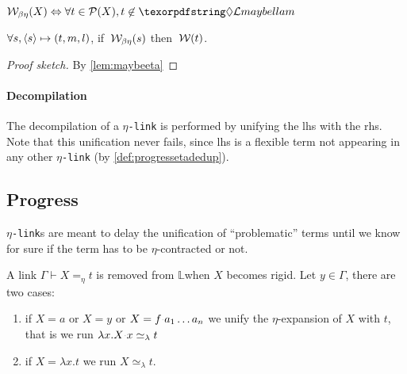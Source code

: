 \documentclass[sigconf,natbib=false,review]{acmart}
\newcommand{\appsep}{\ensuremath{\textcolor{lightgray}{\cdot}}}
\newcommand{\UnifRel}{\ensuremath{\simeq}}
\newcommand{\Ue}{\ensuremath{\UnifRel_\lambda}\xspace}
\newcommand{\linkMacro}[1]{\ensuremath{#1}\texttt{-link}\xspace}
\newcommand{\linketa} {\linkMacro{\eta}}
\newcommand{\linketaM}[3]{\ensuremath{#1 \vdash #2 =_\eta #3}}
\newcommand{\lhs}{lhs\xspace}
\newcommand{\rhs}{rhs\xspace}
\newcommand{\linkStore}{\texorpdfstring{\ensuremath{\mathbb{L}}\xspace}{L}}
\begin{document}
\begin{definition}[$\wellb_{\beta \eta}$]
  $
  \wellb_{\beta \eta}(X) \Leftrightarrow \forall t \in \subterm{X}, t \not\in \notllambda{}
  $
\end{definition}

\begin{lemma}\label{lem:w-enforcement-maybeeta}
  $\forall s, \langle s \rangle\mapsto(t,m,l)$, if $\:\mathcal{W}_{\beta \eta}(s)$  then $\:\mathcal{W}(t)$.
\end{lemma}

\begin{proof}[Proof sketch]
  By \cref{lem:maybeeta}
\end{proof}


\paragraph{Decompilation}
The decompilation of a \linketa is performed by unifying
the \lhs with the \rhs. Note that this unification never fails, since \lhs is a
flexible term not appearing in any other \linketa
(by \cref{def:progressetadedup}).

\subsection{Progress}\label{sec:etaprogress}

\linketa{}s are meant to delay the unification of ``problematic'' terms until
we know for sure if the term has to be $\eta$-contracted or not.

\newcommand{\progressetaleft}{\emph{$\eta$-progress-\lhs}\xspace}
\begin{definition}[\progressetaleft]\label{def:progressetaleft}
A link \linketaM{\Gamma}{X}{t} is removed from \linkStore when
$X$ becomes rigid. Let $y\in\Gamma$, there are two cases:
\begin{enumerate}
  \item if $X = a$ or $X = y$ or $X = f \appsep a_1\ldots a_n$
    we unify the $\eta$-expansion of $X$ with $t$, that is we run
    $\lambda x.X \appsep x\Ue{} t$
    \item if $X = \lambda x.t$ we run $X \Ue{} t$.
\end{enumerate}
\end{definition}

\end{document}
